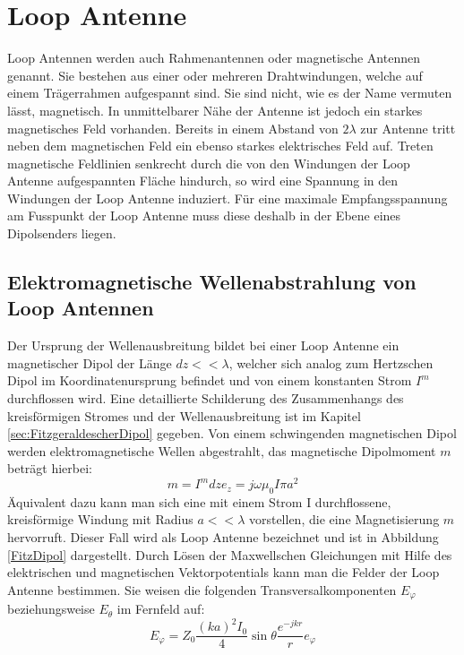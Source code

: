 



\newpage
\section{Loop Antenne}
Loop Antennen werden auch Rahmenantennen oder magnetische Antennen genannt. Sie bestehen aus einer oder mehreren Drahtwindungen, welche auf einem Trägerrahmen aufgespannt sind. Sie sind nicht, wie es der Name vermuten lässt, magnetisch. In unmittelbarer Nähe der Antenne ist jedoch ein starkes magnetisches Feld vorhanden. Bereits in einem Abstand von $2\lambda$ zur Antenne tritt neben dem magnetischen Feld ein ebenso starkes elektrisches Feld auf. Treten magnetische Feldlinien senkrecht durch die von den Windungen der Loop Antenne aufgespannten Fläche hindurch, so wird eine Spannung in den Windungen der Loop Antenne induziert. Für eine maximale Empfangsspannung am Fusspunkt der Loop Antenne muss diese deshalb in der Ebene eines Dipolsenders liegen.


\subsection{Elektromagnetische Wellenabstrahlung von Loop Antennen}
Der Ursprung der Wellenausbreitung bildet bei einer Loop Antenne ein magnetischer Dipol der Länge $dz<<\lambda$, welcher sich analog zum Hertzschen Dipol im Koordinatenursprung befindet und von einem konstanten Strom $I^{m}$ durchflossen wird. Eine detaillierte Schilderung des Zusammenhangs des kreisförmigen Stromes und der Wellenausbreitung ist im Kapitel \ref{sec:FitzgeraldescherDipol} gegeben. Von einem schwingenden magnetischen Dipol werden elektromagnetische Wellen abgestrahlt, das magnetische Dipolmoment $m$ beträgt hierbei:
\begin{equation}
m=I^{m}dze_z=j\omega\mu_{0}I\pi a^{2}
\end{equation}
Äquivalent dazu kann man sich eine mit einem Strom I durchflossene, kreisförmige Windung mit Radius $a<<\lambda$ vorstellen, die eine Magnetisierung $m$ hervorruft. Dieser Fall wird als Loop Antenne bezeichnet und ist in Abbildung \ref{FitzDipol} dargestellt. Durch Lösen der Maxwellschen Gleichungen mit Hilfe des elektrischen und magnetischen Vektorpotentials kann man die Felder der Loop Antenne bestimmen. Sie weisen die folgenden Transversalkomponenten $E_{\varphi}$ beziehungsweise $E_{\theta}$ im Fernfeld auf:
\begin{equation}
E_{\varphi}=Z_{0}\dfrac{(ka)^2I_{0}}{4}\sin \theta \dfrac{e^{-jkr}}{r} e_{\varphi}
\end{equation}

